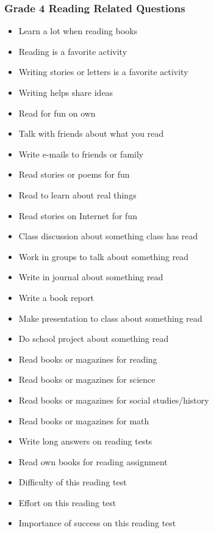 \documentclass[letterpaper,12p,twoside]{article} %
\begin{document}
\begin{singlespace}
\subsubsection{Grade 4 Reading Related Questions}
\begin{itemize}
	\item Learn a lot when reading books
	\item Reading is a favorite activity
	\item Writing stories or letters is a favorite activity
	\item Writing helps share ideas
	\item Read for fun on own
	\item Talk with friends about what you read
	\item Write e-mails to friends or family
	\item Read stories or poems for fun
	\item Read to learn about real things
	\item Read stories on Internet for fun
	\item Class discussion about something class has read
	\item Work in groups to talk about something read
	\item Write in journal about something read
	\item Write a book report
	\item Make presentation to class about something read
	\item Do school project about something read
	\item Read books or magazines for reading
	\item Read books or magazines for science
	\item Read books or magazines for social studies/history
	\item Read books or magazines for math
	\item Write long answers on reading tests
	\item Read own books for reading assignment
	\item Difficulty of this reading test
	\item Effort on this reading test
	\item Importance of success on this reading test
\end{itemize}


\end{singlespace}
\end{document}
